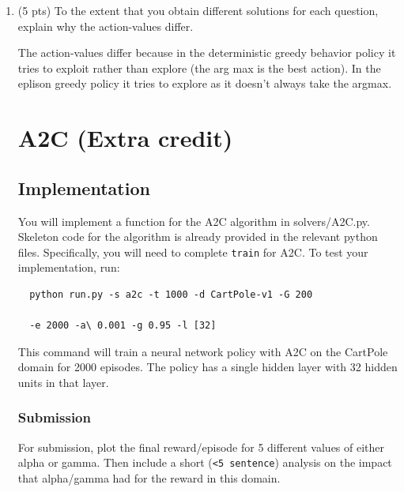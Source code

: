 \documentclass[a4paper]{article}
\theoremstyle{definition}
\newenvironment{soln}{
    \leavevmode\color{blue}\ignorespaces
}{}
\begin{document}
\begin{enumerate}
\item (5 pts) To the extent that you obtain different solutions for each question, explain why the action-values  differ. \\
\begin{soln}
    The action-values differ because in the deterministic greedy behavior policy it tries to exploit rather than explore
    (the arg max is the best action). In the eplison greedy policy it tries to explore as it doesn't always take the argmax.
\end{soln}

\section{A2C (Extra credit)}
\subsection{Implementation}

You will implement a function for the A2C algorithm in solvers/A2C.py.
% 
Skeleton code for the algorithm is already provided in the relevant python files.
% 
Specifically, you will need to complete \verb|train| for A2C.
% 
To test your implementation, run:
% 
\begin{verbatim}
  python run.py -s a2c -t 1000 -d CartPole-v1 -G 200 
  
  -e 2000 -a\ 0.001 -g 0.95 -l [32]
\end{verbatim}
% 
This command will train a neural network policy with A2C on the CartPole domain for 2000 episodes.
% 
The policy has a single hidden layer with 32 hidden units in that layer.
\subsubsection*{Submission}
% 

For submission, plot the final reward/episode for 5 different values of either alpha or gamma. Then include a short (\verb|<5 sentence|) analysis on the impact that alpha/gamma had for the reward in this domain.


\end{enumerate}
\end{document}
